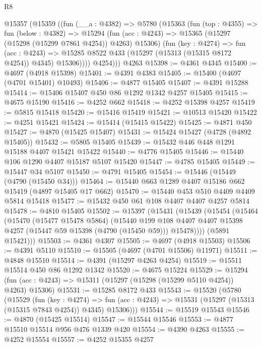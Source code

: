 \begin{lexlean}{R8}
\begin{coremodule}
    @15357
      (@15359
        ((fun (__a : @4382) =>
        @5780
          (@15363
            (fun (top : @4355) =>
            fun (below : @4382) =>
            @15294
              (fun (acc : @4243) => @15365 (@15297 (@15298 (@15299 @7861 @4254)) @4263) @15306)
              (fun (key : @4274) =>
              fun (acc : @4243) =>
              @15285 @8522 @433 (@15297 (@15313 (@15315 @8172 @4254)) @4345) @15306))))
          @4254)))
    @4263
@15398 := @4361 @4345
@15400 := @4697 (@4918 @15398)
@15401 := @4391 @4383
@15405 := @15400 (@4697 (@4701 @15401) @10493)
@15406 := @4877 @15405
@15407 := @4391 @15288
@15414 := @15406 @15407 @450 @86 @1292 @1342 @4257 @15405
@15415 := @4675 @15190
@15416 := @4252 @662
@15418 := @4252 @15398 @4257
@15419 := @5815 @15418
@15420 := @15416 @15419
@15421 := @10513 @15420
@15422 := @4251 @15421
@15424 := @15414 (@15415 @15422)
@15425 := @4871 @450
@15427 := @4870 (@15425 @15407)
@15431 := @15424 @15427 (@4728 (@4892 @15405))
@15432 := @5805 @15405
@15439 := @15432 @446 @448 @1291 @15188 @4407 @15421 @15422
@15440 := @4776 @15405
@15446 := @15440 @106 @1290 @4407 @15187 @5107 @15420
@15447 := @4785 @15405
@15449 := @15447 @34 @5107
@15450 := @4791 @15405
@15454 := @15446 (@15449 (@4790 (@15450 @34)))
@15464 := @15440 @663 @1289 @4407 @15186 @662 @15419 (@4897 @15405 @17 @662)
@15470 := @15440 @453 @510 @4409 @4409 @5814 @15418
@15477 := @15432 @450 @61 @108 @4407 @4407 @4257 @5814
@15478 := @4810 @15405
@15502 := @15397
    (@15431
      (@15439
        (@15454
          (@15464
            (@15470
              (@15477 @15478 @5864)
              (@15440
                @199
                @108
                @4407
                @4407
                @15398
                @4257
                (@15447 @59 @15398 (@4790 (@15450 @59)))
                @15478))))
        (@5891 @15421)))
@15503 := @4361 @4307
@15505 := @4697 (@4918 @15503)
@15506 := @4391 @5110
@15510 := @15505 (@4697 (@4701 @15506) @11971)
@15511 := @4848 @15510
@15514 := @4391 (@15297 @4263 @4254)
@15519 := @15511 @15514 @450 @86 @1292 @1342
@15520 := @4675 @15224
@15529 := @15294 (fun (acc : @4243) => @15311 (@15297 (@15298 (@15299 @5110 @4254)) @4263) @15306)
@15531 := @15285 @8172 @433
@15543 := @15520
    (@5780
      (@15529
        (fun (key : @4274) =>
        fun (acc : @4243) => @15531 (@15297 (@15313 (@15315 @7843 @4254)) @4345) @15306)))
@15544 := @15519 @15543
@15546 := @4870 (@15425 @15514)
@15547 := @15544 @15546
@15553 := @4877 @15510 @15514 @956 @476 @1339 @420
@15554 := @4390 @4263
@15555 := @4252 @15554
@15557 := @4252 @15355 @4257

\end{coremodule}
\end{lexlean}
